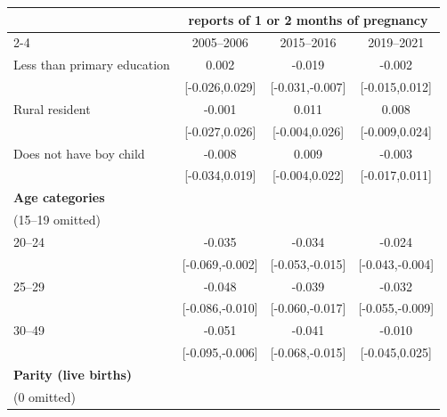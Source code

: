\begin{tabular}{l*{3}{c}}
\toprule
                    &\multicolumn{3}{c}{reports of 1 or 2 months of pregnancy}           \\\cmidrule(lr){2-4}
                    &\multicolumn{1}{c}{2005–2006}&\multicolumn{1}{c}{2015–2016}&\multicolumn{1}{c}{2019–2021}\\
\midrule
\hspace*{1em}Less than primary education&                 0.002&                -0.019&                -0.002\\
                    &        [-0.026,0.029]&       [-0.031,-0.007]&        [-0.015,0.012]\\
\addlinespace
\hspace*{1em}Rural resident&                -0.001&                 0.011&                 0.008\\
                    &        [-0.027,0.026]&        [-0.004,0.026]&        [-0.009,0.024]\\
\addlinespace
\hspace*{1em}Does not have boy child&                -0.008&                 0.009&                -0.003\\
                    &        [-0.034,0.019]&        [-0.004,0.022]&        [-0.017,0.011]\\
\addlinespace
\textbf{Age categories} \\ (15–19 omitted)&                      &                      &                      \\
\addlinespace
\hspace*{1em}20–24  &                -0.035&                -0.034&                -0.024\\
                    &       [-0.069,-0.002]&       [-0.053,-0.015]&       [-0.043,-0.004]\\
\addlinespace
\hspace*{1em}25–29  &                -0.048&                -0.039&                -0.032\\
                    &       [-0.086,-0.010]&       [-0.060,-0.017]&       [-0.055,-0.009]\\
\addlinespace
\hspace*{1em}30–49  &                -0.051&                -0.041&                -0.010\\
                    &       [-0.095,-0.006]&       [-0.068,-0.015]&        [-0.045,0.025]\\
\addlinespace
\textbf{Parity (live births)} \\ (0 omitted)&                      &                      &                      \\

\end{tabular}

